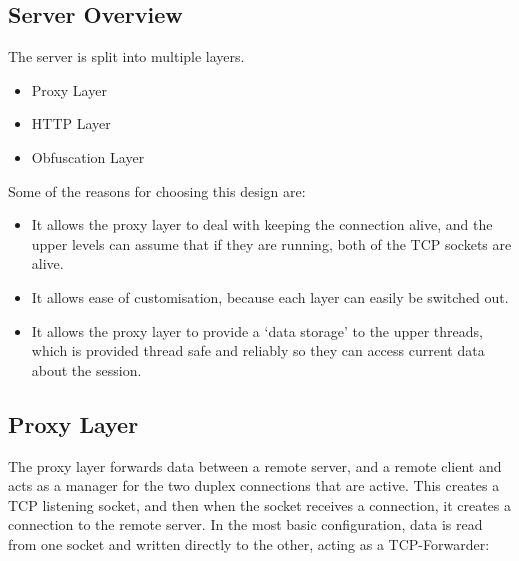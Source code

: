 \subsection{Server Overview}
The server is split into multiple layers.
\begin{itemize}
    \item Proxy Layer
    \item HTTP Layer
    \item Obfuscation Layer
\end{itemize}
Some of the reasons for choosing this design are:
\begin{itemize}
    \item It allows the proxy layer to deal with keeping the connection alive, and the upper levels can assume that if they are running, both of the TCP sockets are alive.
    \item It allows ease of customisation, because each layer can easily be switched out.
    \item It allows the proxy layer to provide a `data storage' to the upper threads, which is provided thread safe and reliably so they can access current data about the session.
\end{itemize}


\subsection{Proxy Layer}
The proxy layer forwards data between a remote server, and a remote client and acts as a manager for the two duplex connections that are active. This creates a TCP listening socket, and then when the socket receives a connection, it creates a connection to the remote server.
In the most basic configuration, data is read from one socket and written directly to the other, acting as a TCP-Forwarder:
\begin{center}
\end{center}


